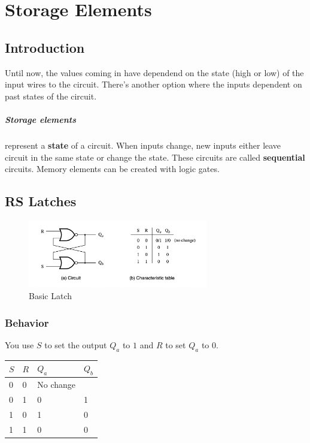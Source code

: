 \documentclass[a4paper,12pt]{report}
\begin{document}
\chapter{Storage Elements}
\section{Introduction}
Until now, the values coming in have dependend on the state (high or low) of the input 
wires to the circuit. There's another option where the inputs dependent on past states 
of the circuit.

\paragraph{Storage elements } represent a \textbf{state} of a circuit. When inputs 
change, new inputs either leave circuit in the same state or change the state. These 
circuits are called \textbf{sequential} circuits. Memory elements can be created 
with logic gates. 

\section{RS Latches}
\begin{figure}[h]
\centering
\includegraphics[width=0.7\textwidth]{../media/basicLatch.png}
\caption{Basic Latch}
\label{latch-basic}
\end{figure}
\subsection{Behavior} 
You use $S$ to set the output $Q_a$ to $1$ and $R$ to set $Q_a$ to $0$.

\begin{tabular}{ll|ll}
$S$ & $R$ & $Q_a$ & $Q_b$ \\
\hline
0 & 0 & No change &  \\
0 & 1 & 0 & 1 \\
1 & 0 & 1 & 0 \\
1 & 1 & 0 & 0 \\
\end{tabular}
\end{document}
